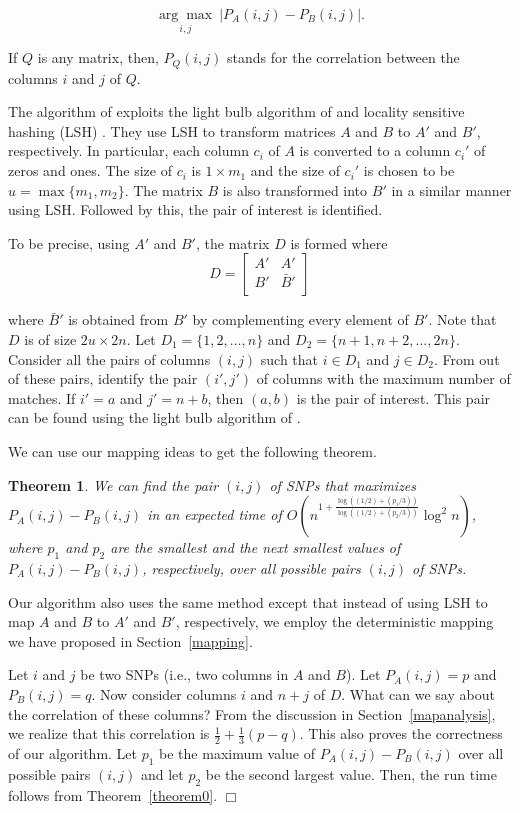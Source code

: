 \documentclass{article}
\newtheorem{theorem}{Theorem}[section]
\theoremstyle{definition}
\theoremstyle{remark}
\begin{document}
$$\underset{i,j}{\arg\max}\ |P_{A}(i,j)-P_{B}(i,j)|.$$

If $Q$ is any matrix, then, $P_Q(i,j)$ stands for the correlation between the columns $i$ and $j$ of $Q$.

The algorithm of \cite{PBK11} exploits the light bulb algorithm of \cite{RSJ89} and locality sensitive hashing (LSH) \cite{M02}. They use LSH to transform matrices $A$ and $B$ to $A'$ and $B'$, respectively. In particular, each column $c_i$ of $A$ is converted to a column $c_i'$ of zeros and ones. The size of $c_i$ is $1\times m_1$ and the size of $c_i'$ is chosen to be $u=\max\{m_1,m_2\}$. The matrix $B$ is also transformed into $B'$ in a similar manner using LSH. Followed by this, the pair of interest is identified.

To be precise, using $A'$ and $B'$, the matrix $D$ is formed where
$$D=\left[ \begin{array}{cc}
A' & A' \\
B' & \bar{B}' \\
\end{array} \right] $$

where $\bar{B}'$ is obtained from $B'$ by complementing every element of $B'$. Note that $D$ is of size $2u\times 2n$. Let $D_1=\{1,2,\ldots,n\}$ and $D_2=\{n+1,n+2,\ldots,2n\}$. Consider all the pairs of columns $(i,j)$ such that $i\in D_1$ and $j\in D_2$. From out of these pairs, identify the pair $(i',j')$ of columns with the maximum number of matches.  If $i'=a$ and $j'=n+b$, then $(a,b)$ is the pair of interest. This pair can be found using the light bulb algorithm of \cite{RSJ89}.

We can use our mapping ideas to get the following theorem.

\begin{theorem}\label{theorem6.1}
We can find the pair $(i,j)$ of SNPs that maximizes $P_A(i,j)-P_B(i,j)$ in an expected time of $O\left (n^{1+\frac{\log ((1/2)+(p_1/3))}{\log ((1/2)+(p_2/3))}}\log^2n\right )$, where $p_1$ and $p_2$ are the smallest and the next smallest values of $P_A(i,j)-P_B(i,j)$, respectively, over all possible pairs $(i,j)$ of SNPs.
 \end{theorem}

 Our algorithm also uses the same method except that instead of using LSH to map $A$ and $B$ to $A'$ and $B'$, respectively, we employ the deterministic mapping we have proposed in Section~\ref{mapping}.

Let $i$ and $j$ be two SNPs (i.e., two columns in $A$ and $B$). Let $P_A(i,j)=p$ and $P_B(i,j)=q$. Now consider columns $i$ and $n+j$ of $D$. What can we say about the correlation of these columns? From the discussion in Section~\ref{mapanalysis}, we realize that this correlation is $\frac{1}{2}+\frac{1}{3}(p-q)$. This also proves the correctness of our algorithm. Let $p_1$ be the maximum value of $P_A(i,j)-P_B(i,j)$ over all possible pairs $(i,j)$ and let $p_2$ be the second largest value. Then, the run time follows from Theorem~\ref{theorem0}. $\Box$
\end{document}

